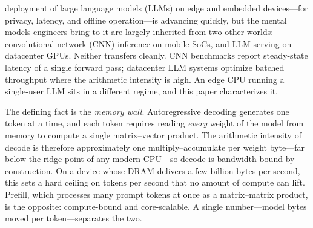 \documentclass[10pt,journal,compsoc]{IEEEtran}
\begin{document}
\maketitle
\IEEEdisplaynontitleabstractindextext
\IEEEpeerreviewmaketitle

 deployment of large language models (LLMs) on edge and embedded devices---for
privacy, latency, and offline operation---is advancing quickly, but the mental models engineers
bring to it are largely inherited from two other worlds: convolutional-network (CNN) inference on
mobile SoCs, and LLM serving on datacenter GPUs. Neither transfers cleanly. CNN benchmarks report
steady-state latency of a single forward pass; datacenter LLM systems optimize batched throughput
where the arithmetic intensity is high. An edge CPU running a single-user LLM sits in a different
regime, and this paper characterizes it.

The defining fact is the \emph{memory wall}. Autoregressive decoding generates one token at a
time, and each token requires reading \emph{every} weight of the model from memory to compute a
single matrix--vector product. The arithmetic intensity of decode is therefore approximately one
multiply--accumulate per weight byte---far below the ridge point of any modern CPU---so decode is
bandwidth-bound by construction. On a device whose DRAM delivers a few billion bytes per second,
this sets a hard ceiling on tokens per second that no amount of compute can lift. Prefill, which
processes many prompt tokens at once as a matrix--matrix product, is the opposite: compute-bound
and core-scalable. A single number---model bytes moved per token---separates the two.
\end{document}
